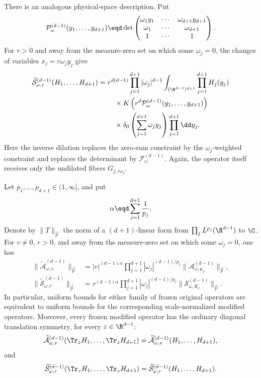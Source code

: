 There is an analogous physical-space description.  Put
\[
  \mathcal P_\omega^{(d-1)}(y_1,\ldots,y_{d+1})
  \eqd
  \det\begin{pmatrix}
    \omega_1y_1&\cdots&\omega_{d+1}y_{d+1}\\
    \omega_1&\cdots&\omega_{d+1}\\
    1&\cdots&1
  \end{pmatrix}.
\]
For \(r>0\) and away from the measure-zero set on which some
\(\omega_j=0\), the changes of variables \(x_j=r\omega_jy_j\) give
\[
\begin{aligned}
  \widetilde{\mathcal S}_{\omega,r}^{(d-1)}
  (H_1,\ldots,H_{d+1})
  ={}&r^{d(d-1)}
  \prod_{j=1}^{d+1}|\omega_j|^{d-1}
  \int_{(\R^{d-1})^{d+1}}\prod_{j=1}^{d+1}H_j(y_j)\\
  &\quad\times
  K\left(
    r^d\mathcal P_\omega^{(d-1)}
    (y_1,\ldots,y_{d+1})
  \right)\\
  &\quad\times
  \delta_0\left(\sum_{j=1}^{d+1}\omega_jy_j\right)
  \prod_{j=1}^{d+1}\dd y_j.
\end{aligned}
\]
Here the inverse dilation replaces the zero-sum constraint by the
\(\omega_j\)-weighted constraint and replaces the determinant by
\(\mathcal P_\omega^{(d-1)}\).  Again, the operator itself receives only
the undilated fibers \(G_{j,r\omega_j}\).

\begin{corollary}
\label{cor:frozen-modified-operator-bounds}
Let \(p_1,\ldots,p_{d+1}\in(1,\infty]\), and put
\[
  \alpha\eqd\sum_{j=1}^{d+1}\frac1{p_j}.
\]
Denote by \(\|T\|_{\vec p}\) the norm of a \((d+1)\)-linear form from
\(\prod_jL^{p_j}(\R^{d-1})\) to \(\C\).  For \(v\ne0\), \(r>0\), and
away from the measure-zero set on which some \(\omega_j=0\), one has
\[
\begin{aligned}
  \bigl\|\widetilde{\mathcal A}_{\omega,v}^{(d-1)}\bigr\|_{\vec p}
  &={}|v|^{(d-1)\alpha}
  \prod_{j=1}^{d+1}|\omega_j|^{(d-1)/p_j}
  \bigl\|\mathcal A_{\omega,\mu_v}^{(d-1)}\bigr\|_{\vec p},\\
  \bigl\|\widetilde{\mathcal S}_{\omega,r}^{(d-1)}\bigr\|_{\vec p}
  &={}r^{(d-1)\alpha}
  \prod_{j=1}^{d+1}|\omega_j|^{(d-1)/p_j}
  \bigl\|\mathcal S_{\omega,K_r}^{(d-1)}\bigr\|_{\vec p}.
\end{aligned}
\]
In particular, uniform bounds for either family of frozen original
operators are equivalent to uniform bounds for the corresponding
scale-normalized modified operators.  Moreover, every frozen modified
operator has the ordinary diagonal translation symmetry, for every
\(z\in\R^{d-1}\):
\[
  \widetilde{\mathcal A}_{\omega,v}^{(d-1)}
  (\Tr_zH_1,\ldots,\Tr_zH_{d+1})
  =
  \widetilde{\mathcal A}_{\omega,v}^{(d-1)}
  (H_1,\ldots,H_{d+1}),
\]
and
\[
  \widetilde{\mathcal S}_{\omega,r}^{(d-1)}
  (\Tr_zH_1,\ldots,\Tr_zH_{d+1})
  =
  \widetilde{\mathcal S}_{\omega,r}^{(d-1)}
  (H_1,\ldots,H_{d+1}).
\]
\end{corollary}

